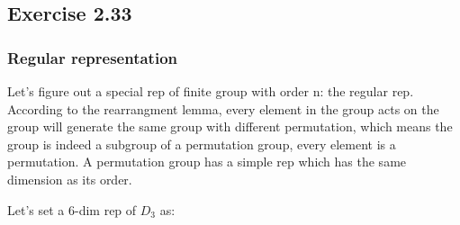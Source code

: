 \documentclass[]{ctexart}
\begin{document}
	\subsection{Exercise 2.33}
		\subsubsection{Regular representation}
			Let's figure out a special rep of finite group with order n: the regular rep. According to the rearrangment lemma, every element in the group acts on the group will generate the same group with different permutation, which means the group is indeed a subgroup of a permutation group, every element is a permutation. A permutation group has a simple rep which has the same dimension as its order. 
			
			Let's set a 6-dim rep of $D_3$ as:
\end{document}
